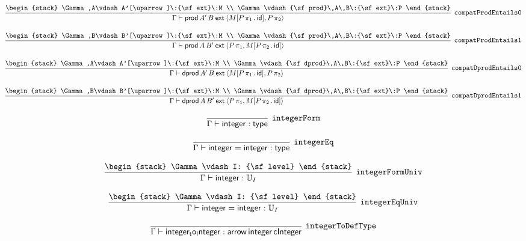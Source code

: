 \[
\infer[{\tt compatProdEntails0}]{\Gamma \vdash {\sf prod}\,A'\,B\:{\sf ext}\:\langle M[P\, \pi_1\,.\,{\sf id}],P\, \pi_2\rangle }{
\begin{stack}
\Gamma ,A\vdash A'[\uparrow ]\:{\sf ext}\:M
\\
\Gamma \vdash {\sf prod}\,A\,B\:{\sf ext}\:P
\end{stack}}
\]

\[
\infer[{\tt compatProdEntails1}]{\Gamma \vdash {\sf prod}\,A\,B'\:{\sf ext}\:\langle P\, \pi_1,M[P\, \pi_2\,.\,{\sf id}]\rangle }{
\begin{stack}
\Gamma ,B\vdash B'[\uparrow ]\:{\sf ext}\:M
\\
\Gamma \vdash {\sf prod}\,A\,B\:{\sf ext}\:P
\end{stack}}
\]

\[
\infer[{\tt compatDprodEntails0}]{\Gamma \vdash {\sf dprod}\,A'\,B\:{\sf ext}\:\langle M[P\, \pi_1\,.\,{\sf id}],P\, \pi_2\rangle }{
\begin{stack}
\Gamma ,A\vdash A'[\uparrow ]\:{\sf ext}\:M
\\
\Gamma \vdash {\sf dprod}\,A\,B\:{\sf ext}\:P
\end{stack}}
\]

\[
\infer[{\tt compatDprodEntails1}]{\Gamma \vdash {\sf dprod}\,A\,B'\:{\sf ext}\:\langle P\, \pi_1,M[P\, \pi_2\,.\,{\sf id}]\rangle }{
\begin{stack}
\Gamma ,B\vdash B'[\uparrow ]\:{\sf ext}\:M
\\
\Gamma \vdash {\sf dprod}\,A\,B\:{\sf ext}\:P
\end{stack}}
\]

\[
\infer[{\tt integerForm}]{\Gamma \vdash {\sf integer}: {\sf type}}{}
\]

\[
\infer[{\tt integerEq}]{\Gamma \vdash {\sf integer}= {\sf integer}: {\sf type}}{}
\]

\[
\infer[{\tt integerFormUniv}]{\Gamma \vdash {\sf integer}: {\Bbb U}_{I}}{
\begin{stack}
\Gamma \vdash I: {\sf level}
\end{stack}}
\]

\[
\infer[{\tt integerEqUniv}]{\Gamma \vdash {\sf integer}= {\sf integer}: {\Bbb U}_{I}}{
\begin{stack}
\Gamma \vdash I: {\sf level}
\end{stack}}
\]

\[
\infer[{\tt integerToDefType}]{\Gamma \vdash {\sf integer_to_Integer}: {\sf arrow}\,{\sf integer}\,{\sf cInteger}}{}
\]

